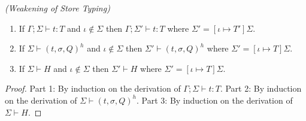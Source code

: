 \begin{lem}
\emph{(Weakening of Store Typing)}\label{lem:weakening-store-typing}
\begin{enumerate}
\item If $\Gamma ; \Sigma \vdash t : T$ and $\iota \notin \Sigma$ then $\Gamma ; \Sigma' \vdash t : T$ where $\Sigma' = [\iota \mapsto T']\Sigma$.
\item If $\Sigma \vdash (t, \sigma, Q)^h$ and $\iota \notin \Sigma$ then $\Sigma' \vdash (t, \sigma, Q)^h$ where $\Sigma' = [\iota \mapsto T]\Sigma$.
\item If $\Sigma \vdash H$ and $\iota \notin \Sigma$ then $\Sigma' \vdash H$ where $\Sigma' = [\iota \mapsto T]\Sigma$.
\end{enumerate}
\end{lem}
\begin{proof}
Part 1: By induction on the derivation of $\Gamma ; \Sigma \vdash t : T$. Part 2: By induction on the derivation of $\Sigma \vdash (t, \sigma, Q)^h$. Part 3: By induction on the derivation of $\Sigma \vdash H$.
\end{proof}

